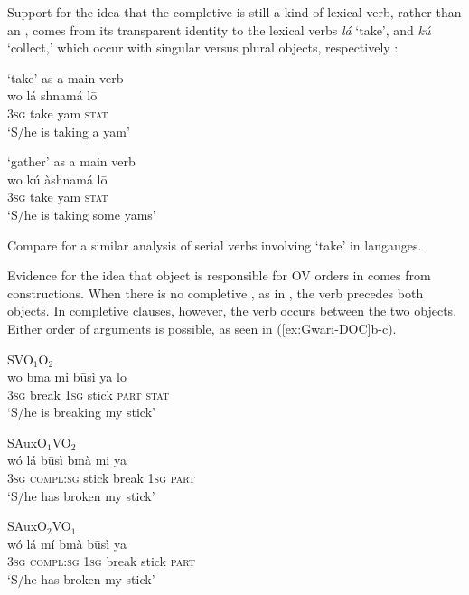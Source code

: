 \documentclass[output=paper,newtxmath,modfonts,nonflat,draftmode]{langsci/langscibook}
\begin{document}
Support for the idea that the completive is still a kind of lexical verb, rather than an , comes from its transparent identity to the lexical verbs \textit{lá} `take', and \textit{kú} `collect,' which occur with singular versus plural objects, respectively \citep[63]{hyman1970}:

\ea \label{ex:Gwari-takecollect}

\ea \label{ex:Gwari-take} { `take' as a main verb}	\\
\gll wo lá shnamá l\=o \\
3\textsc{sg} take yam \textsc{stat} \\
\glt `S/he is taking a yam' \hfill \citep[][92]{hyman1970}

\ex \label{ex:Gwari-gather} { `gather' as a main verb}	\\
\gll wo kú àshnamá l{\=o}\\
3\textsc{sg} take yam \textsc{stat}\\
\glt `S/he is taking some yams' \hfill \citep[][93]{hyman1970}
\z
\z

Compare \citet{aboh09} for a similar analysis of serial verbs involving `take' in  langauges.

Evidence for the idea that object  is responsible for OV orders in  comes from  constructions. When there is no completive , as in , the verb precedes both objects. In completive clauses, however, the verb occurs between the two objects. Either order of arguments is possible, as seen in (\ref{ex:Gwari-DOC}b-c). 

\ea \label{ex:Gwari-DOC}

\ea \label{ex:Gwari-DOC-VOO} {SVO$_1$O$_2$}	\\
\gll wo bma mi b\={u}sì ya lo \\
3\textsc{sg} break 1\textsc{sg} stick \textsc{part} \textsc{stat} \\
\glt `S/he is breaking my stick' \hfill \citep[][92]{hyman1970}

\ex \label{ex:Gwari-DOC-O1VO2} {SAuxO$_1$VO$_2$}	\\
\gll wó lá  b\={u}sì bmà mi ya \\
3\textsc{sg} \textsc{compl:sg} stick break 1\textsc{sg} \textsc{part}  \\
\glt `S/he has broken my stick' \hfill \citep[][93]{hyman1970}

\ex \label{ex:Gwari-DOC-O2VO1}{SAuxO$_2$VO$_1$}	\\
\gll wó lá mí bmà b\={u}sì ya \\
3\textsc{sg} \textsc{compl:sg} 1\textsc{sg} break stick \textsc{part} \\
\glt `S/he has broken my stick'	\hfill \citep[][93]{hyman1970}
\z
\end{document}
